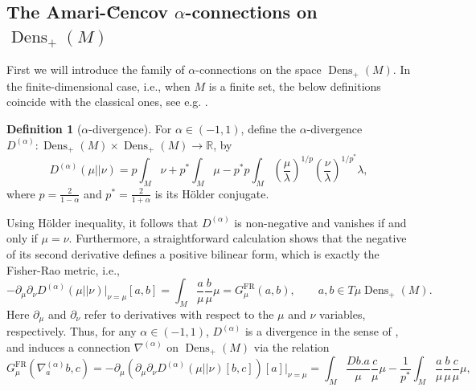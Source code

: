 \documentclass[11pt]{amsart}
\theoremstyle{definition}
\newtheorem{definition}[theorem]{Definition}
\newcommand{\dx}{\lambda}
\newcommand{\Prob}{\operatorname{Prob}(M)}
\newcommand{\Dens}{\operatorname{Dens}_+(M)}
\newcommand{\GFR}{G^{\mathrm{FR}}}
\begin{document}
\subsection{The Amari-\u{C}encov $\alpha$-connections on $\Dens$}
First we will introduce the family of $\alpha$-connections on the space $\Dens$.
In the finite-dimensional case, i.e., when $M$ is a finite set, the below definitions coincide with the classical ones, see e.g. \cite{amari2000methods,ay2015information}.
\begin{definition}[$\alpha$-divergence]
    For $\alpha\in (-1,1)$, define the $\alpha$-divergence $D^{(\alpha)}:\Dens\times \Dens\to \mathbb{R}$, by
    \[
    D^{(\alpha)}(\mu||\nu) = p\int_M \nu + p^*\int_M \mu -p^*p\int_M \left(\frac{\mu}{\dx}\right)^{1/p}\left(\frac{\nu}{\dx}\right)^{1/p^*}\dx,
    \]
    where $p=\frac{2}{1-\alpha}$ and $p^* = \frac{2}{1+\alpha}$ is its H\"older conjugate.
\end{definition}  
Using H\"older inequality, it follows that $D^{(\alpha)}$ is non-negative and vanishes if and only if $\mu=\nu$.
Furthermore, a straightforward calculation shows that the negative of its second derivative defines a positive bilinear form, which is exactly the Fisher-Rao metric, i.e., 
\[
 -\partial_\mu \partial_\nu D^{(\alpha)}(\mu||\nu)|_{\nu=\mu}[a,b] = \int_M \frac{a}{\mu}\frac{b}{\mu}\mu=\GFR_\mu(a,b),
\qquad a,b\in T\mu\Dens.
\]
Here $\partial_\mu$ and $\partial_\nu$ refer to derivatives with respect to the $\mu$ and $\nu$ variables, respectively.
Thus, for any $\alpha\in (-1,1)$,  $D^{(\alpha)}$ is a divergence in the sense of \cite[Section~4.4]{ay2015information}, and  induces a connection $\nabla^{(\alpha)}$ on $\Dens$ via the relation
\begin{equation}\label{eq:a_conn_def}
\GFR_\mu(\nabla^{(\alpha)}_a b, c) 
= - \partial_\mu(\partial_\mu\partial_\nu D^{(\alpha)}(\mu||\nu)[b,c])[a]|_{\nu=\mu} 
= \int_M \frac{Db.a}{\mu}\frac{c}{\mu}\mu-\frac{1}{p^*}\int_M \frac{a}{\mu}\frac{b}{\mu}\frac{c}{\mu}
\mu,
\end{equation}
\end{document}
